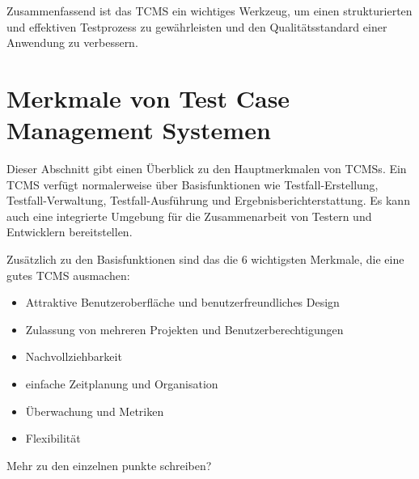 \documentclass[a4paper, fontsize=11pt, parskip=half, twoside]{scrreprt}
\begin{document}
	Zusammenfassend ist das \ac{TCMS} ein wichtiges Werkzeug, um einen strukturierten und effektiven Testprozess zu gewährleisten und den Qualitätsstandard einer Anwendung zu verbessern.

	\section{Merkmale von Test Case Management Systemen} \label{sec:functionsOfTCMS}
	Dieser Abschnitt gibt einen Überblick zu den Hauptmerkmalen von \aclp{TCMS}.
	Ein \ac{TCMS} verfügt normalerweise über Basisfunktionen wie Testfall-Erstellung, Testfall-Verwaltung, Testfall-Ausführung und Ergebnisberichterstattung. 
	Es kann auch eine integrierte Umgebung für die Zusammenarbeit von Testern und Entwicklern bereitstellen.
	
	Zusätzlich zu den Basisfunktionen sind das die 6 wichtigsten Merkmale, die eine gutes \ac{TCMS} ausmachen:
	
	\begin{itemize}
		\item Attraktive Benutzeroberfläche und benutzerfreundliches Design
		\item Zulassung von mehreren Projekten und Benutzerberechtigungen
		\item Nachvollziehbarkeit
		\item einfache Zeitplanung und Organisation
		\item Überwachung und Metriken
		\item Flexibilität
	\end{itemize}
	Mehr zu den einzelnen punkte schreiben?
	
	\textcite{lead_articles_nodate}	
	
	
	
	
\end{document}
